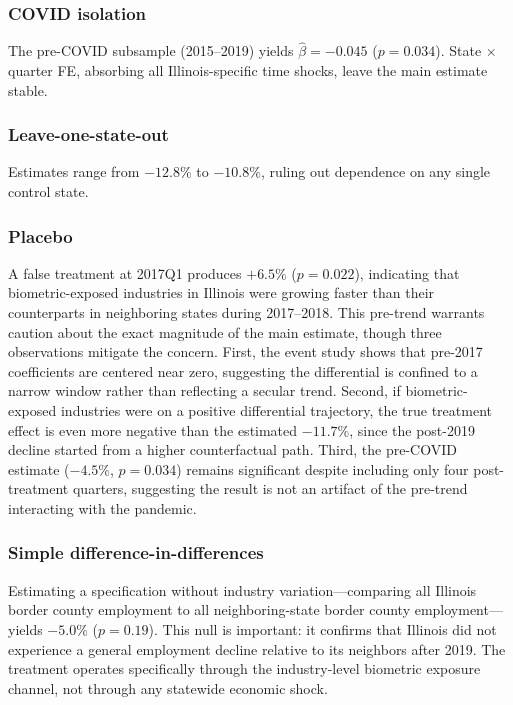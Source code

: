 \documentclass[12pt]{article}
\begin{document}
\subsubsection*{COVID isolation} The pre-COVID subsample (2015--2019) yields $\hat{\beta} = -0.045$ ($p = 0.034$). State $\times$ quarter FE, absorbing all Illinois-specific time shocks, leave the main estimate stable.

\subsubsection*{Leave-one-state-out} Estimates range from $-12.8\%$ to $-10.8\%$, ruling out dependence on any single control state.

\subsubsection*{Placebo} A false treatment at 2017Q1 produces $+6.5\%$ ($p = 0.022$), indicating that biometric-exposed industries in Illinois were growing faster than their counterparts in neighboring states during 2017--2018. This pre-trend warrants caution about the exact magnitude of the main estimate, though three observations mitigate the concern. First, the event study shows that pre-2017 coefficients are centered near zero, suggesting the differential is confined to a narrow window rather than reflecting a secular trend. Second, if biometric-exposed industries were on a positive differential trajectory, the true treatment effect is even more negative than the estimated $-11.7\%$, since the post-2019 decline started from a higher counterfactual path. Third, the pre-COVID estimate ($-4.5\%$, $p = 0.034$) remains significant despite including only four post-treatment quarters, suggesting the result is not an artifact of the pre-trend interacting with the pandemic.

\subsubsection*{Simple difference-in-differences} Estimating a specification without industry variation---comparing all Illinois border county employment to all neighboring-state border county employment---yields $-5.0\%$ ($p = 0.19$). This null is important: it confirms that Illinois did not experience a general employment decline relative to its neighbors after 2019. The treatment operates specifically through the industry-level biometric exposure channel, not through any statewide economic shock.
\end{document}
